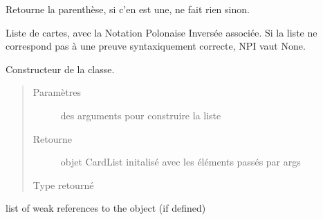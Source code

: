 \documentclass[letterpaper,10pt,french]{sphinxmanual}
\begin{document}
\begin{fulllineitems}
\begin{fulllineitems}
\end{fulllineitems}


\begin{fulllineitems}
\label{\detokenize{doc_classe:cards.Card.turn_parenthesis}}
Retourne la parenthèse, si c’en est une, ne fait rien sinon.

\end{fulllineitems}


\end{fulllineitems}


\begin{fulllineitems}
\label{\detokenize{doc_classe:cards.CardList}}
Liste de cartes, avec la Notation Polonaise Inversée associée.
Si la liste ne correspond pas à une preuve syntaxiquement correcte,
NPI vaut None.

\begin{fulllineitems}
\label{\detokenize{doc_classe:cards.CardList.__init__}}
Constructeur de la classe.
\begin{quote}\begin{description}
\item[{Paramètres}] \leavevmode
{} \textendash{} des arguments pour construire la liste

\item[{Retourne}] \leavevmode
objet CardList initalisé avec les éléments passés par args

\item[{Type retourné}] \leavevmode
{\hyperref[\detokenize{doc_classe:cards.CardList}]{}}

\end{description}\end{quote}

\end{fulllineitems}


\begin{fulllineitems}
\label{\detokenize{doc_classe:cards.CardList.__weakref__}}
list of weak references to the object (if defined)


\end{fulllineitems}
\end{fulllineitems}
\end{document}
